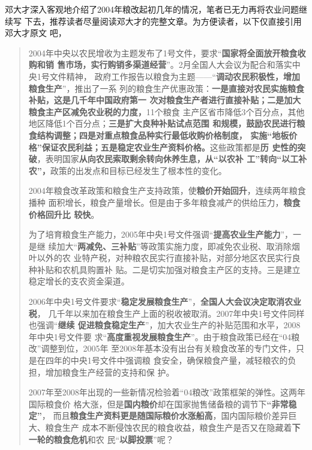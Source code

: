 邓大才深入客观地介绍了2004年粮改起初几年的情况，笔者已无力再将农业问题继续写
下去，推荐读者尽量阅读邓大才的完整文章。为方便读者，以下仅直接引用邓大才原文
吧，
\begin{quotation}
  2004年中央以农民增收为主题发布了1号文件，要求“\textbf{国家将全面放开粮食收购和销
    售市场，实行购销多渠道经营}”。2月全国人大会议为配合和落实中央1号文件精神，
  政府工作报告以粮食为主题——“\textbf{调动农民积极性，增加粮食生产}”，推出了一系
  列的粮食生产优惠政策：\textbf{一是直接对农民实施粮食补贴，这是几千年中国政府第一
    次对粮食生产者进行直接补贴；二是加大粮食主产区减免农业税的力度，}11个粮食
  主产区省市降低3个百分点，其他地区降低1个百分点；\textbf{三是扩大良种补贴试点范围
    和规模，鼓励农民进行粮食结构调整；四是对重点粮食品种实行最低收购价格制度，
    实施“地板价格”保证农民利益；五是稳定农业生产资料价格。}这些政策都是\textbf{历
    史性的突破}，表明国家\textbf{从向农民索取剩余转向休养生息，从“以农补
    工”转向“以工补农”，}政策的出发点和目标已经发生了根本性的变化。

  2004年粮食改革政策和粮食生产支持政策，使\textbf{粮价开始回升}，连续两年粮食播种
  面积增长，粮食产量增长。但是由于多年粮食减产的供给压力，\textbf{粮食价格回升比
    较快}。

  为了培育粮食生产能力，2005年中央1号文件强调“\textbf{提高农业生产能力}”，一是继
  续加大“\textbf{两减免、三补贴}”等政策实施力度，即减免农业税、取消除烟叶以外的农
  业特产税，对种粮农民实行直接补贴，对部分地区农民实行良种补贴和农机具购置补
  贴。二是切实加强对粮食主产区的支持。三是建立稳定增长的支农资金渠道。

  2006年中央1号文件要求“\textbf{稳定发展粮食生产}”，\textbf{全国人大会议决定取消农业税}，
  几千年以来加在粮食生产上面的税收被取消。2007年中央1号文件同样也强调“\textbf{继续
    促进粮食稳定生产}”，加大农业生产的补贴范围和水平，2008年中央1号文件要
  求“\textbf{高度重视发展粮食生产}”。由于粮食政策已经在“04粮改”调整到位，2005年
  至2008年基本没有出台有关粮食改革的专门文件，只是在四年的中央1号文件中强调粮
  食安全，确保粮食产量，减轻粮农的负担，增加粮食生产经营的支持和保
  护。\cite{dacailianggai}

  2007年至2008年出现的一些新情况检验着“04粮改”政策框架的弹性。这两年国际粮食价
  格大涨，但是\textbf{国内粮价}却在国家抛售储备粮的调节下\textbf{“非常稳定”}，
  而且\textbf{粮食生产资料更是随国际粮价水涨船高}，国内国际粮价差异巨大、粮食生产
  成本不断侵蚀农民的粮食收益，粮食生产是否又在隐藏着\textbf{下一轮的粮食危机}和农
  民“\textbf{以脚投票}”呢？
\end{quotation}


